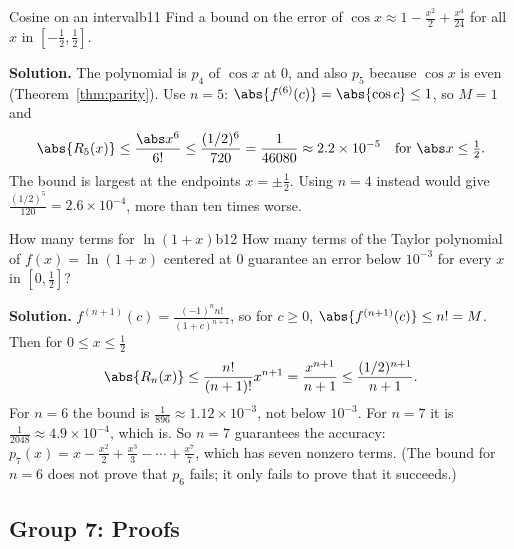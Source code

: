 \documentclass[11pt]{article}
\begin{document}
\begin{exmp}{Cosine on an interval}{b11}
Find a bound on the error of $\cos x\approx1-\frac{x^2}2+\frac{x^4}{24}$ for all $x$ in $[-\frac12,\frac12]$.

\textbf{Solution.} The polynomial is $p_4$ of $\cos x$ at $0$, and also $p_5$ because $\cos x$ is even (Theorem~\ref{thm:parity}). Use $n=5$: $\abs{f^{(6)}(c)}=\abs{\cos c}\le1$, so $M=1$ and
\[
\abs{R_5(x)}\le\frac{\abs x^6}{6!}\le\frac{(1/2)^6}{720}=\frac1{46080}\approx2.2\times10^{-5}\quad\text{for }\abs x\le\tfrac12 .
\]
The bound is largest at the endpoints $x=\pm\frac12$. Using $n=4$ instead would give $\frac{(1/2)^5}{120}=2.6\times10^{-4}$, more than ten times worse.
\end{exmp}

\begin{exmp}{How many terms for $\ln(1+x)$}{b12}
How many terms of the Taylor polynomial of $f(x)=\ln(1+x)$ centered at $0$ guarantee an error below $10^{-3}$ for every $x$ in $[0,\frac12]$?

\textbf{Solution.} $f^{(n+1)}(c)=\frac{(-1)^nn!}{(1+c)^{n+1}}$, so for $c\ge0$, $\abs{f^{(n+1)}(c)}\le n!=M$. Then for $0\le x\le\frac12$
\[
\abs{R_n(x)}\le\frac{n!}{(n+1)!}x^{n+1}=\frac{x^{n+1}}{n+1}\le\frac{(1/2)^{n+1}}{n+1}.
\]
For $n=6$ the bound is $\frac1{896}\approx1.12\times10^{-3}$, not below $10^{-3}$. For $n=7$ it is $\frac1{2048}\approx4.9\times10^{-4}$, which is. So $n=7$ guarantees the accuracy: $p_7(x)=x-\frac{x^2}2+\frac{x^3}3-\cdots+\frac{x^7}7$, which has seven nonzero terms. (The bound for $n=6$ does not prove that $p_6$ fails; it only fails to prove that it succeeds.)
\end{exmp}

\subsection*{Group 7: Proofs}
\end{document}

